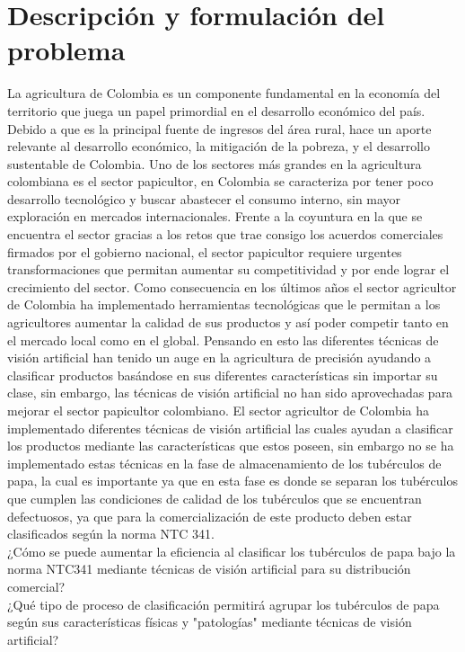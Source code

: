 \section{Descripción y formulación del problema}
La agricultura de Colombia es un componente fundamental en la economía del territorio que juega un papel primordial en el desarrollo económico del país. Debido a que es la principal fuente de ingresos del área rural, hace un aporte relevante al desarrollo económico, la mitigación de la pobreza, y el desarrollo sustentable de Colombia. Uno de los sectores más   grandes en la agricultura colombiana es el sector papicultor, en Colombia se caracteriza por tener poco desarrollo tecnológico y buscar abastecer el consumo interno, sin mayor exploración en mercados internacionales. Frente a la coyuntura en la que se encuentra el sector gracias a los retos que trae consigo los acuerdos comerciales firmados por el gobierno nacional, el sector papicultor requiere urgentes transformaciones que permitan aumentar su competitividad y por ende lograr el crecimiento del sector.
Como consecuencia en los últimos años el sector agricultor de Colombia ha implementado herramientas tecnológicas que le permitan a los agricultores aumentar la calidad de sus productos y así poder competir tanto en el mercado local como en el global. Pensando en esto las diferentes técnicas de visión artificial han tenido un auge en la agricultura de precisión ayudando a clasificar productos basándose en sus diferentes características sin importar su clase, sin embargo, las técnicas de visión artificial no han sido aprovechadas para mejorar el sector papicultor colombiano.
El sector agricultor de Colombia ha implementado diferentes técnicas de visión artificial las cuales ayudan a clasificar los productos mediante las características que estos poseen, sin embargo no se ha implementado estas técnicas en la fase de almacenamiento de los tubérculos de papa, la cual es importante ya que en esta fase es donde se separan los tubérculos que cumplen las condiciones de calidad de los tubérculos que se encuentran defectuosos, ya que para la comercialización de este producto deben estar clasificados según la norma NTC 341.\\ 

¿Cómo se puede aumentar la eficiencia al clasificar los tubérculos de papa bajo la norma NTC341 mediante técnicas de visión artificial para su distribución comercial?\\

¿Qué tipo de proceso de clasificación permitirá agrupar los tubérculos de papa según sus características físicas y "patologías" mediante técnicas de visión artificial?	



